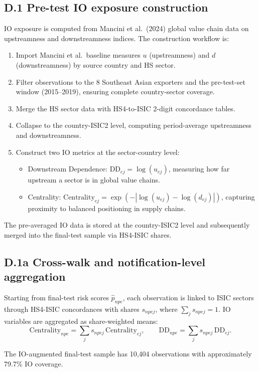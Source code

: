 \documentclass[11pt,a4paper]{article}
\begin{document}
\subsection*{D.1 Pre-test IO exposure construction}
IO exposure is computed from Mancini et al.\ (2024) global value chain data on upstreamness and downstreamness indices. The construction workflow is:
\begin{enumerate}
  \item Import Mancini et al.\ baseline measures $u$ (upstreamness) and $d$ (downstreamness) by source country and HS sector.
  \item Filter observations to the 8 Southeast Asian exporters and the pre-test-set window (2015--2019), ensuring complete country-sector coverage.
  \item Merge the HS sector data with HS4-to-ISIC 2-digit concordance tables.
  \item Collapse to the country-ISIC2 level, computing period-average upstreamness and downstreamness.
  \item Construct two IO metrics at the sector-country level:
  \begin{itemize}
    \item Downstream Dependence: $\mathrm{DD}_{ej} = \log(u_{ej})$, measuring how far upstream a sector is in global value chains.
    \item Centrality: $\mathrm{Centrality}_{ej} = \exp\left(-\left|\log(u_{ej}) - \log(d_{ej})\right|\right)$, capturing proximity to balanced positioning in supply chains.
  \end{itemize}
\end{enumerate}
The pre-averaged IO data is stored at the country-ISIC2 level and subsequently merged into the final-test sample via HS4-ISIC shares.

\subsection*{D.1a Cross-walk and notification-level aggregation}
Starting from final-test risk scores $\hat p_{npe}$, each observation is linked to ISIC sectors through HS4-ISIC concordances with shares $s_{npej}$, where $\sum_j s_{npej}=1$. IO variables are aggregated as share-weighted means:
\[
\mathrm{Centrality}_{npe}=\sum_j s_{npej}\,\mathrm{Centrality}_{ej},
\qquad
\mathrm{DD}_{npe}=\sum_j s_{npej}\,\mathrm{DD}_{ej}.
\]

The IO-augmented final-test sample has 10,404 observations with approximately 79.7\% IO coverage.
\end{document}
